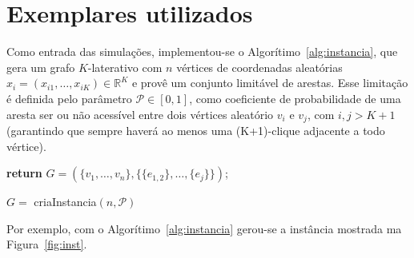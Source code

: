 \documentclass[a4paper,12pt]{report}
\begin{document}
	\section{Exemplares utilizados}
	Como entrada das simulações, implementou-se o Algorítimo~\ref{alg:instancia}, que gera um grafo $K$-laterativo com $n$ vértices de coordenadas aleatórias $x_i = (x_{i1},\dots,x_{iK})\in \mathbb{R}^K$ e provê um conjunto limitável de arestas. Esse limitação é definida pelo parâmetro $\mathcal{P} \in [0,1]$, como coeficiente de probabilidade de uma aresta ser ou não acessível entre dois vértices aleatório $v_i$ e $v_j$, com $i,j>K+1$ (garantindo que sempre haverá ao menos uma (K+1)-clique adjacente a todo vértice).
	\\
	
	\begin{algorithm}[H]
		\label{alg:instancia}
		\textbf{return} $G = (\{v_1,\dots,v_n\}, \{\{e_{1,2}\}, \dots,\{e_{j}\}\})$;
		\caption{$G =$ criaInstancia$(n, \mathcal{P})$}
	\end{algorithm}
	\vspace{0.4cm}
	
	Por exemplo, com o Algorítimo~\ref{alg:instancia} gerou-se a instância mostrada ma Figura~\ref{fig:inst}.
	
\end{document}
